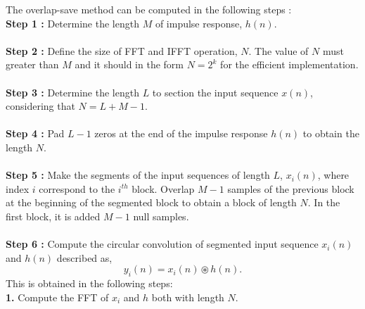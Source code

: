 The overlap-save method can be computed in the following steps \cite{Smith1999,Blahut1985} :\\
\textbf{ Step 1 :} Determine the length $M$ of impulse response, $h(n)$.\\ \\ 
\textbf{ Step 2 :} Define the size of FFT and IFFT operation, $N$. The value of $N$ must greater than $M$ and it should in the form $N = 2^k$ for the efficient implementation.\\ \\
\textbf{ Step 3 :} Determine the length $L$ to section the input sequence $x(n)$, considering that $N=L+M-1$.\\ \\   
\textbf{ Step 4 :} Pad $L-1$ zeros at the end of the impulse response $h(n)$ to obtain the length $N$.\\ \\
\textbf{ Step 5 :} Make the segments of the input sequences of length $L$, $x_i(n)$, where index $i$ correspond to the $i^{th}$ block. Overlap $M-1$ samples of the previous block at the beginning of the segmented block to obtain a block of length $N$. In the first block, it is added $M-1$ null samples.\\ \\
\textbf{ Step 6 :} Compute the circular convolution of segmented input sequence $x_i(n)$ and $h(n)$ described as,
\begin{equation}
y_i(n)= x_i(n) \circledast h(n).
\label{genFIR}
\end{equation}
This is obtained in the following steps:\\
\textbf{1. } Compute the FFT of $x_i$ and $h$ both with length $N$.\\

